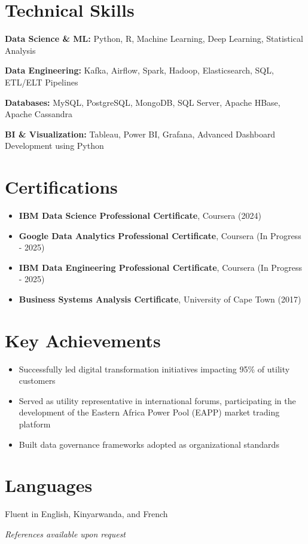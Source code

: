 \documentclass[11pt,letterpaper]{article}
\newcommand{\skillgroup}[2]{
	\noindent\textbf{\color{primarycolor}#1:} \color{secondarycolor}#2\par
	\vspace{4pt}
}
\begin{document}
	\section*{Technical Skills}
	
	\skillgroup{Data Science \& ML}{Python, R, Machine Learning, Deep Learning, Statistical Analysis}
	
	\skillgroup{Data Engineering}{Kafka, Airflow, Spark, Hadoop, Elasticsearch, SQL, ETL/ELT Pipelines}
	
	\skillgroup{Databases}{MySQL, PostgreSQL, MongoDB, SQL Server, Apache HBase, Apache Cassandra}
	
	\skillgroup{BI \& Visualization}{Tableau, Power BI, Grafana, Advanced Dashboard Development using Python}
	
	\section*{Certifications}
	\begin{itemize}[leftmargin=*,itemsep=2pt]
		\item \textbf{IBM Data Science Professional Certificate}, Coursera (2024)
		\item \textbf{Google Data Analytics Professional Certificate}, Coursera (In Progress - 2025)
		\item \textbf{IBM Data Engineering Professional Certificate}, Coursera (In Progress - 2025)
		\item \textbf{Business Systems Analysis Certificate}, University of Cape Town (2017)
	\end{itemize}
	
	\section*{Key Achievements}
	\begin{itemize}[leftmargin=*,itemsep=2pt]
		\item Successfully led digital transformation initiatives impacting 95\% of utility customers
		\item Served as utility representative in international forums, participating in the development of the Eastern Africa Power Pool (EAPP) market trading platform	
		\item Built data governance frameworks adopted as organizational standards
	\end{itemize}
	
	\section*{Languages}
	Fluent in English, Kinyarwanda, and French
	
	\vspace{8pt}
	\noindent\textit{References available upon request}
	
\end{document}
